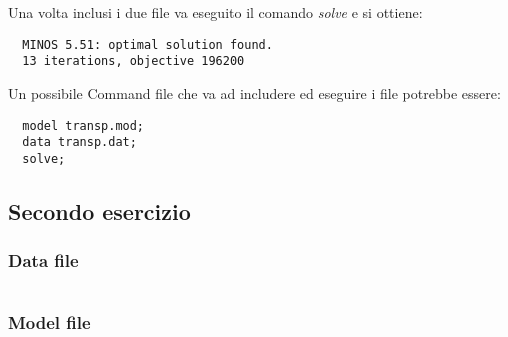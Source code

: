 \documentclass[\main/main.tex]{subfiles}
\begin{document}
Una volta inclusi i due file va eseguito il comando \textit{solve} e si ottiene:

\begin{verbatim}
  MINOS 5.51: optimal solution found.
  13 iterations, objective 196200
\end{verbatim}

Un possibile Command file che va ad includere ed eseguire i file potrebbe essere:

\begin{verbatim}
  model transp.mod;
  data transp.dat;
  solve;
\end{verbatim}

\subsection{Secondo esercizio}
\subsubsection{Data file}
\inputminted{ampl}{\main/chapters/ampl/multi/multi.dat}
\subsubsection{Model file}
\inputminted{ampl}{\main/chapters/ampl/multi/multi.mod}
\end{document}
